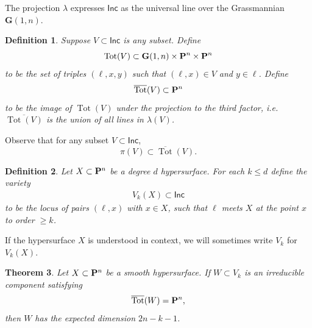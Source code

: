 \documentclass[12pt,reqno]{amsart}
\theoremstyle{plain}
\newtheorem{theorem}{Theorem}[section]
\newtheorem{definition}[theorem]{Definition}
\theoremstyle{remark}
\numberwithin{equation}{section}
\DeclareMathOperator{\Tot}{Tot}
\renewcommand {\P}{{\bf P}}
\numberwithin{equation}{section}
\newcommand{\G}{\mathbf G}
\begin{document}
The projection $\lambda$ expresses $\mathsf{Inc}$ as the universal
line over the Grassmannian $\G(1,n)$.

\begin{definition}
  \label{definition:TVS}
  Suppose $V \subset \mathsf{Inc}$ is any subset. Define
  \[\Tot(V) \subset \G(1,n) \times \P^{n} \times \P^{n}\] to be the
  set of triples $(\ell,x,y)$ such that $(\ell,x) \in V$ and
  $y \in \ell$.  Define \[\overline{\Tot}(V) \subset \P^{n}\] to be the
  image of $\Tot(V)$ under the projection to the third factor, i.e.
  $\overline{\Tot(V)}$ is the union of all lines in $\lambda(V)$.
\end{definition}

Observe that for any subset $V \subset \mathsf{Inc}$,
\[\pi(V) \subset \overline{\Tot}(V).\]


\begin{definition}
  \label{definition:Vk}
  Let $X \subset \P^{n}$ be a degree $d$ hypersurface. For each
  $k \leq d$ define the variety
\begin{align}
  \label{eq:Vk}
  V_k(X) \subset \mathsf{Inc}
\end{align}
to be the locus of pairs $(\ell, x)$ with $x \in X$, such that $\ell$
meets $X$ at the point $x$ to order $\geq k$.
\end{definition}

If the hypersurface $X$ is understood in context, we will sometimes
write $V_k$ for $V_{k}(X)$.



\begin{theorem}
  \label{theorem:expecteddim} Let $X \subset \P^n$ be a smooth
  hypersurface. If $W \subset V_k$ is an irreducible component
  satisfying \[ \overline{\Tot}(W) = \P^{n},\] then $W$ has the
  expected dimension $2n-k-1$.
\end{theorem}
\end{document}
